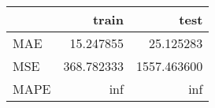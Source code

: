 \begin{tabular}{lrr}
\toprule
{} &       train &         test \\
\midrule
MAE  &   15.247855 &    25.125283 \\
MSE  &  368.782333 &  1557.463600 \\
MAPE &         inf &          inf \\
\bottomrule
\end{tabular}

